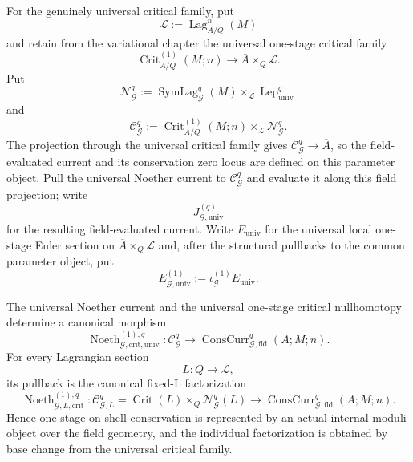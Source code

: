 \begin{construction}
For the genuinely universal critical family, put
\[
\mathscr L:=\operatorname{Lag}_{A/Q}^n(M)
\]
and retain from the variational chapter the universal one-stage critical family
\[
\operatorname{Crit}_{A/Q}^{(1)}(M;n)
\longrightarrow
\overline A\times_Q\mathscr L.
\]
Put
\[
\mathscr N_{\mathcal G}^{q}
:=
\operatorname{SymLag}_{\mathcal G}^{q}(M)
\times_{\mathscr L}
\operatorname{Lep}_{\mathrm{univ}}^q
\]
and
\[
\boxed{
\mathscr C_{\mathcal G}^{q}
:=
\operatorname{Crit}_{A/Q}^{(1)}(M;n)
\times_{\mathscr L}
\mathscr N_{\mathcal G}^{q}.
}
\]
The projection through the universal critical family gives
$\mathscr C_{\mathcal G}^{q}\to\overline A$, so the field-evaluated current and its
conservation zero locus are defined on this parameter object.  Pull the universal
Noether current to $\mathscr C_{\mathcal G}^{q}$ and evaluate it along this field
projection; write
\[
J_{\mathcal G,\mathrm{univ}}^{(q)}
\]
for the resulting field-evaluated current.  Write $E_{\mathrm{univ}}$ for the
universal local one-stage Euler section on
$\overline A\times_Q\mathscr L$ and, after the structural pullbacks to the common
parameter object, put
\[
E_{\mathcal G,\mathrm{univ}}^{(1)}
:=
\iota_{\mathcal G}^{(1)}E_{\mathrm{univ}}.
\]
\end{construction}

\begin{proposition}
\label{prop:symmetry-noether-universal-and-individual-one-stage-conserved-current-factorizations}
The universal Noether current and the universal one-stage critical nullhomotopy
determine a canonical morphism
\[
\boxed{
\operatorname{Noeth}_{\mathcal G,\mathrm{crit},\mathrm{univ}}^{(1),q}:
\mathscr C_{\mathcal G}^{q}
\longrightarrow
\operatorname{ConsCurr}_{\mathcal G,\mathrm{fld}}^{q}(A;M;n).
}
\]
For every Lagrangian section
\[
L:Q\longrightarrow\mathscr L,
\]
its pullback is the canonical fixed-L factorization
\[
\boxed{
\operatorname{Noeth}_{\mathcal G,L,\mathrm{crit}}^{(1),q}:
\mathcal C_{\mathcal G,L}^{q}
=
\operatorname{Crit}(L)\times_Q\mathcal N_{\mathcal G}^{q}(L)
\longrightarrow
\operatorname{ConsCurr}_{\mathcal G,\mathrm{fld}}^{q}(A;M;n).
}
\]
Hence one-stage on-shell conservation is represented by an actual internal moduli
object over the field geometry, and the individual factorization is obtained by
base change from the universal critical family.
\end{proposition}

